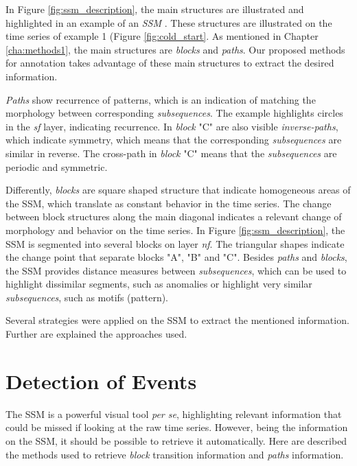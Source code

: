 In Figure \ref{fig:ssm_description}, the main structures are illustrated and highlighted in an example of an \textit{\gls{SSM}} \cite{audiolabs1}. These structures are illustrated on the time series of example 1 (Figure \ref{fig:cold_start}. As mentioned in Chapter \ref{cha:methods1}, the main structures are \textit{blocks} and \textit{paths}. Our proposed methods for annotation takes advantage of these main structures to extract the desired information.
\par
\textit{Paths} show recurrence of patterns, which is an indication of matching the morphology between corresponding \textit{subsequences}. The example highlights circles in the \textit{sf} layer, indicating recurrence. In \textit{block} "C" are also visible \textit{inverse-paths}, which indicate symmetry, which means that the corresponding \textit{subsequences} are similar in reverse. The cross-path in \textit{block} "C" means that the \textit{subsequences} are periodic and symmetric.
\par
Differently, \textit{blocks} are square shaped structure that indicate homogeneous areas of the \gls{SSM}, which translate as constant behavior in the time series. The change between block structures along the main diagonal indicates a relevant change of morphology and behavior on the time series. In Figure \ref{fig:ssm_description}, the \gls{SSM} is segmented into several blocks on layer \textit{nf}. The triangular shapes indicate the change point that separate blocks "A", "B" and "C". Besides \textit{paths} and \textit{blocks}, the \gls{SSM} provides distance measures between \textit{subsequences}, which can be used to highlight dissimilar segments, such as anomalies or highlight very similar \textit{subsequences}, such as motifs (pattern).
\par
Several strategies were applied on the \gls{SSM} to extract the mentioned information. Further are explained the approaches used.

\section{Detection of Events}

The \gls{SSM} is a powerful visual tool \textit{per se}, highlighting relevant information that could be missed if looking at the raw time series. However, being the information on the \gls{SSM}, it should be possible to retrieve it automatically. 
Here are described the methods used to retrieve \textit{block} transition information and \textit{paths} information.

